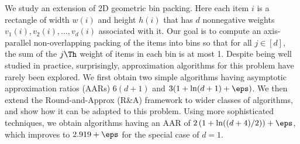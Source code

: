 We study an extension of 2D geometric bin packing.
Here each item $i$ is a rectangle of width $w(i)$ and height $h(i)$
that has $d$ nonnegative weights $v_1(i), v_2(i), \ldots, v_d(i)$ associated with it.
Our goal is to compute an axis-parallel non-overlapping packing of the items into bins so that
for all $j \in [d]$, the sum of the $j\Th$ weight of items in each bin is at most 1.
Despite being well studied in practice, surprisingly,
approximation algorithms for this problem have rarely been explored.
We first obtain two simple algorithms having asymptotic approximation ratios (AARs)
$6(d+1)$ and $3(1 + \ln(d+1) + \eps)$.
We then extend the Round-and-Approx (R\&A) framework
\texorpdfstring{\cite{bansal2014binpacking}}{[Bansal-Khan, SODA'14]}
to wider classes of algorithms, and show how it can be adapted to this problem.
Using more sophisticated techniques, we obtain algorithms having
an AAR of $2\left(1+\ln((d+4)/2)\right)+\eps$,
which improves to $2.919+\eps$ for the special case of $d=1$.
